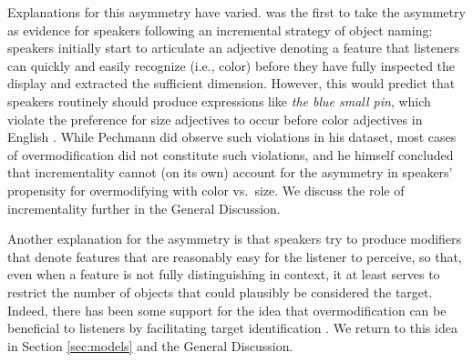 \documentclass[11pt]{article}
\newcommand{\jd}[1]{\textcolor{Red}{[jd: #1]}}
\newcommand{\sectionref}[1]{Section \ref{#1}}
\begin{document}
Explanations for this asymmetry have varied.  was the first to take the asymmetry as evidence for speakers following an incremental strategy of object naming: speakers initially start to articulate an adjective denoting a feature that listeners can quickly and easily recognize (i.e., color) before they have fully inspected the display and extracted the sufficient dimension. However, this would predict that speakers routinely should produce expressions like \emph{the blue small pin}, which violate the preference for size adjectives to occur before color adjectives in English \cite{bloomfield1933, sproat1991}. While Pechmann did observe such violations in his dataset, most cases of overmodification did not constitute such violations, and he himself concluded that incrementality cannot (on its own) account for the asymmetry in speakers' propensity for overmodifying with color vs.~size. We discuss the role of incrementality further in the General Discussion.


Another explanation for the asymmetry is that speakers try to produce modifiers that denote features that are reasonably easy for the listener to perceive, so that, even when a feature is not fully distinguishing in context, it at least serves to restrict the number of objects that could plausibly be considered the target. Indeed, there has been some support for the idea that overmodification can be beneficial to listeners by facilitating target identification \cite{Arts2011, rubiofernandez2016, Paraboni2007}. We return to this idea in \sectionref{sec:models} and the General Discussion.

\end{document}
